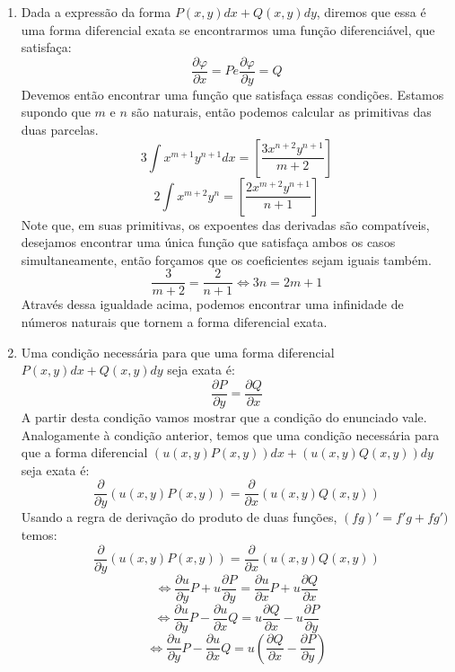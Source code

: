\documentclass[11pt,a4paper]{article}
\begin{document}
\begin{enumerate}
\item Dada a express\~{a}o da forma $ P(x,y)dx + Q(x,y)dy $, diremos que essa \'{e} uma forma diferencial exata se encontrarmos uma fun\c{c}\~{a}o diferenci\'{a}vel, que satisfa\c{c}a: $$ \frac{\partial \varphi}{\partial x} = P e \frac{\partial \varphi}{\partial y} = Q $$ Devemos ent\~{a}o encontrar uma fun\c{c}\~{a}o que satisfa\c{c}a essas condi\c{c}\~{o}es. Estamos supondo que $ m $ e $ n $ s\~{a}o naturais, ent\~{a}o podemos calcular as primitivas das duas parcelas. $$ 3 \int x^{m+1} y^{n+1} dx = \left[\frac{3x^{n+2} y^{n+1}}{m+2} \right] $$ $$ 2 \int x^{m+2} y^{n} = \left[\frac{2x^{m+2} y^{n+1}}{n+1} \right] $$ Note que, em suas primitivas, os expoentes das derivadas s\~{a}o compat\'{i}veis, desejamos encontrar uma \'{u}nica fun\c{c}\~{a}o que satisfa\c{c}a ambos os casos simultaneamente, ent\~{a}o for\c{c}amos que os coeficientes sejam iguais tamb\'{e}m. $$ \frac{3}{m+2} = \frac{2}{n+1} \Leftrightarrow 3n = 2m+1 $$ Atrav\'{e}s dessa igualdade acima, podemos encontrar uma infinidade de n\'{u}meros naturais que tornem a forma diferencial exata.

\item Uma condi\c{c}\~{a}o necess\'{a}ria para que uma forma diferencial $ P(x,y)dx + Q(x,y)dy $ seja exata \'{e}: $$ \frac{\partial P}{\partial y} = \frac{\partial Q}{\partial x} $$ A partir desta condi\c{c}\~{a}o vamos mostrar que a condi\c{c}\~{a}o do enunciado vale. Analogamente \`{a} condi\c{c}\~{a}o anterior, temos que uma condi\c{c}\~{a}o necess\'{a}ria para que a forma diferencial $ (u(x,y) P(x,y))dx + (u(x,y) Q(x,y))dy $ seja exata \'{e}: $$ \frac{\partial}{\partial y} (u(x,y) P(x,y)) = \frac{\partial}{\partial x} (u(x,y) Q(x,y)) $$ Usando a regra de deriva\c{c}\~{a}o do produto de duas fun\c{c}\~{o}es, $ (fg)' = f'g + fg') $ temos: $$ \frac{\partial}{\partial y}(u(x,y)P(x,y)) = \frac{\partial}{\partial x}(u(x,y)Q(x,y)) $$ $$ \Leftrightarrow \frac{\partial u}{\partial y}P + u\frac{\partial P}{\partial y} = \frac{\partial u}{\partial x}P + u\frac{\partial Q}{\partial x} $$ $$ \Leftrightarrow \frac{\partial u}{\partial y}P - \frac{\partial u}{\partial x}Q = u \frac{\partial Q}{\partial x} - u \frac{\partial P}{\partial y} $$ $$ \Leftrightarrow \frac{\partial u}{\partial y}P - \frac{\partial u}{\partial x}Q = u \left(\frac{\partial Q}{\partial x} - \frac{\partial P}{\partial y} \right) $$ 


\end{enumerate}
\end{document}

